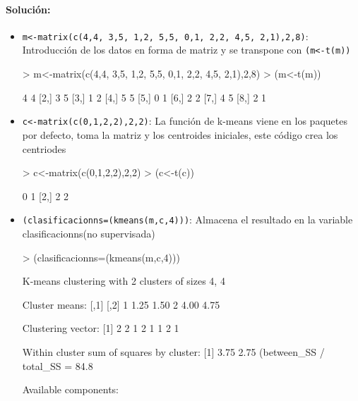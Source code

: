 \documentclass[a4paper, 12pt]{article}
\begin{document}
	\paragraph{Solución:}
	\begin{itemize}
		\item \texttt{m<-matrix(c(4,4, 3,5, 1,2, 5,5, 0,1, 2,2, 4,5, 2,1),2,8)}: 
		Introducción de los datos en forma de matriz y se transpone con \texttt{(m<-t(m))}
\begin{Schunk}
\begin{Sinput}
> m<-matrix(c(4,4, 3,5, 1,2, 5,5, 0,1, 2,2, 4,5, 2,1),2,8)
> (m<-t(m))
\end{Sinput}
\begin{Soutput}
     [,1] [,2]
[1,]    4    4
[2,]    3    5
[3,]    1    2
[4,]    5    5
[5,]    0    1
[6,]    2    2
[7,]    4    5
[8,]    2    1
\end{Soutput}
\end{Schunk}
		\item \texttt{c<-matrix(c(0,1,2,2),2,2)}: 
		La función de k-means viene en los paquetes por defecto, toma la matriz y los centroides iniciales, este código crea los centriodes
\begin{Schunk}
\begin{Sinput}
> c<-matrix(c(0,1,2,2),2,2)
> (c<-t(c))
\end{Sinput}
\begin{Soutput}
     [,1] [,2]
[1,]    0    1
[2,]    2    2
\end{Soutput}
\end{Schunk}
		\item \texttt{(clasificacionns=(kmeans(m,c,4)))}: 
		Almacena el resultado en la variable clasificacionns(no supervisada)
\begin{Schunk}
\begin{Sinput}
> (clasificacionns=(kmeans(m,c,4)))
\end{Sinput}
\begin{Soutput}
K-means clustering with 2 clusters of sizes 4, 4

Cluster means:
  [,1] [,2]
1 1.25 1.50
2 4.00 4.75

Clustering vector:
[1] 2 2 1 2 1 1 2 1

Within cluster sum of squares by cluster:
[1] 3.75 2.75
 (between_SS / total_SS =  84.8 %

Available components:


\end{Soutput}
\end{Schunk}
\end{itemize}
\end{document}
